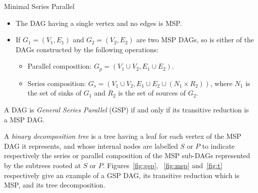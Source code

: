 \begin{mydef}Minimal Series Parallel
\begin{itemize}
\item The DAG having a single vertex and no edges is MSP.
\item If $G_1=(V_1,E_1)$ and $G_2=(V_2,E_2)$ are two MSP DAGs, so is either of the DAGs constructed by the following operations:
\begin{itemize}
\item Parallel composition: $G_p=(V_1\cup V_2,E_1\cup E_2)$.
\item Series composition: $G_s=(V_1\cup V_2,E_1\cup E_2\cup (N_1 \times R_2))$, where $N_1$ is the set of sinks of $G_1$ and $R_2$ is the set of sources of $G_2$.
\end{itemize}
\end{itemize}
\end{mydef}

\begin{mydef}
A DAG is \emph{General Series Parallel} (GSP) if and only if its transitive reduction is a MSP DAG.
\end{mydef}

A \emph{binary decomposition tree} is a tree having a leaf for each vertex of the MSP DAG it represents, and whose internal nodes are labelled $S$ or $P$ to indicate respectively the series or parallel composition of the MSP sub-DAGs represented by the subtrees rooted at $S$ or $P$. Figures~\ref{fig:gsp}, ~\ref{fig:msp} and~\ref{fig:t} respectively give an example of a GSP DAG, its transitive reduction which is MSP, and its tree decomposition.

